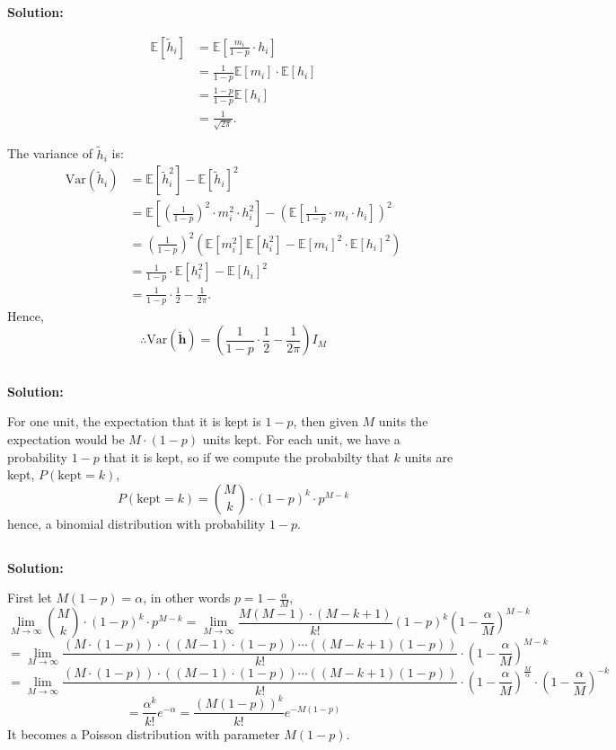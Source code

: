 \documentclass{article}
\newenvironment{solution}
  {\par\noindent\textbf{Solution:}\par}
  {\par}
\begin{document}
\begin{solution}
\begin{align*}
\mathbb{E}[\tilde{h}_i] 
&= \mathbb{E}\left[\frac{m_i}{1-p} \cdot h_i\right] \\
&= \frac{1}{1-p} \mathbb{E}[m_i] \cdot \mathbb{E}[h_i] \\
&= \frac{1-p}{1-p} \mathbb{E}[h_i] \\
&= \frac{1}{\sqrt{2\pi}}.
\end{align*}

The variance of \(\tilde{h}_i\) is:
\begin{align*}
\text{Var}(\tilde{h}_i) 
&= \mathbb{E}[\tilde{h}_i^2] - \mathbb{E}[\tilde{h}_i]^2 \\
&= \mathbb{E}\left[\left(\frac{1}{1-p}\right)^2 \cdot m_i^2 \cdot h_i^2\right] 
   - \left(\mathbb{E}\left[\frac{1}{1-p} \cdot m_i \cdot h_i\right]\right)^2 \\
&= \left(\frac{1}{1-p}\right)^2 \left(\mathbb{E}[m_i^2] \mathbb{E}[h_i^2] 
   - \mathbb{E}[m_i]^2 \cdot \mathbb{E}[h_i]^2\right) \\
&= \frac{1}{1-p} \cdot \mathbb{E}[h_i^2] - \mathbb{E}[h_i]^2 \\
&= \frac{1}{1-p} \cdot \frac{1}{2} - \frac{1}{2\pi}.
\end{align*}
  Hence,
  $$\therefore \text{Var}(\tilde{\textbf{h}}) = \left(\frac{1}{1-p} \cdot \frac{1}{2} - \frac{1}{2\pi}\right)I_M$$ 

\end{solution}


\subsection{}
\begin{solution}
For one unit, the expectation that it is kept is $ 1- p$, then given $M$ units the expectation would be $M \cdot (1-p)$ units kept.
For each unit, we have a probability $1-p$ that it is kept, so if we compute the probabilty that $k$ units are kept, $P(\text{kept} =k)$,
$$P(\text{kept} =k) = {M\choose k} \cdot (1-p)^k\cdot p^{M-k}$$
hence, a binomial distribution with probability $1-p$.
\end{solution}



\subsection{}
\begin{solution}
  First let $M(1-p) = \alpha$, in other words $p = 1- \frac{\alpha}{M}$,
  $$ \lim_{M \to \infty} {M \choose k}\cdot (1-p)^k \cdot p^{M-k} = \lim_{M \to \infty} \frac{M(M-1)\cdot(M-k+1)}{k!}(1-p)^k (1-\frac{\alpha}{M})^{M-k} $$
  $$ = \lim_{M \to \infty} \frac{\left(M\cdot(1-p)\right)\cdot \left((M-1)\cdot(1-p)\right) \cdots \left((M-k+1)(1-p)\right)}{k!} \cdot (1-\frac{\alpha}{M})^{M-k}$$
  $$ = \lim_{M \to \infty} \frac{\left(M\cdot(1-p)\right)\cdot \left((M-1)\cdot(1-p)\right) \cdots \left((M-k+1)(1-p)\right)}{k!} \cdot (1-\frac{\alpha}{M})^{\frac{M}{\alpha}} \cdot (1-\frac{\alpha}{M})^{-k}$$
  $$=\frac{\alpha^k}{k!}e^{-\alpha} = \frac{\left(M(1-p)\right)^k}{k!}e^{-M(1-p)}$$
It becomes a Poisson distribution with parameter $M(1-p)$.
\end{solution}
\end{document}
